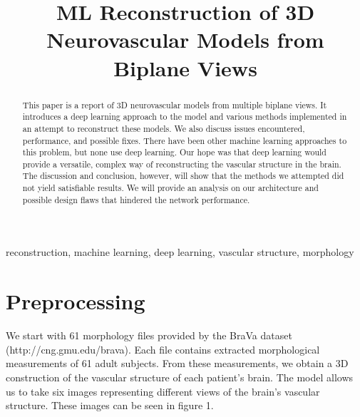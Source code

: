 \documentclass[conference, 10pt]{IEEEtran}
\begin{document}
\title{ML Reconstruction of 3D Neurovascular Models from Biplane Views\\
}

\author{
\and
{}
}

\maketitle

\begin{abstract}
    This paper is a report of 3D neurovascular models from multiple biplane views. 
    It introduces a deep learning approach to the model and various methods implemented in an attempt to reconstruct these models. 
    We also discuss issues encountered, performance, and possible fixes. 
    There have been other machine learning approaches to this problem, but none use deep learning.
    Our hope was that deep learning would provide a versatile, complex way of reconstructing the vascular structure in the brain.
    The discussion and conclusion, however, will show that the methods we attempted did not yield satisfiable results. 
    We will provide an analysis on our architecture and possible design flaws that hindered the network performance.
\end{abstract}

\begin{IEEEkeywords}
reconstruction, machine learning, deep learning, vascular structure, morphology
\end{IEEEkeywords}

\section{Preprocessing}
We start with 61 morphology files provided by the BraVa dataset (http://cng.gmu.edu/brava). Each file contains extracted morphological measurements of 61 adult subjects. From these measurements, we obtain a 3D construction of the vascular structure of each patient's brain. The model allows us to take six images representing different views of the brain's vascular structure. These images can be seen in figure 1.
\end{document}
